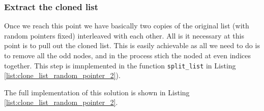 \subsubsection{Extract the cloned list}
\label{clone_list_random_pointer:sec:interleaved_lists3}
Once we reach this point we have basically two copies of the original list (with random pointers fixed) interleaved with each other. 
All is it necessary at this point is to pull out the cloned list. 
This is easily achievable as all we need to do is to remove all the odd nodes, and in the process stich the noded at even indices together.
This step is imnplemented in the function \lstinline[columns=fixed]{split_list} in Listing \ref{list:clone_list_random_pointer_2}).

The full implementation of this solution is shown in Listing  \ref{list:clone_list_random_pointer_2}.

